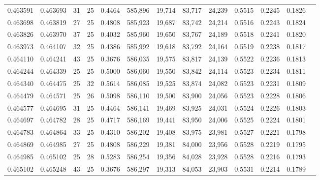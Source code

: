 \begin{tabular}{rrrrrrrrrrrrr}
0.463591 & 0.463693 &    31 &  25 &                                     0.4464 & 585,896 &  19,714 &  83,717 &  24,239 & 0.5515 & 0.2245 & 0.1826 \\
0.463698 & 0.463819 &    27 &  25 &                                     0.4808 & 585,923 &  19,687 &  83,742 &  24,214 & 0.5516 & 0.2243 & 0.1824 \\
0.463826 & 0.463970 &    37 &  25 &                                     0.4032 & 585,960 &  19,650 &  83,767 &  24,189 & 0.5518 & 0.2241 & 0.1820 \\
0.463973 & 0.464107 &    32 &  25 &                                     0.4386 & 585,992 &  19,618 &  83,792 &  24,164 & 0.5519 & 0.2238 & 0.1817 \\
0.464110 & 0.464241 &    43 &  25 &                                     0.3676 & 586,035 &  19,575 &  83,817 &  24,139 & 0.5522 & 0.2236 & 0.1813 \\
0.464244 & 0.464339 &    25 &  25 &                                     0.5000 & 586,060 &  19,550 &  83,842 &  24,114 & 0.5523 & 0.2234 & 0.1811 \\
0.464340 & 0.464475 &    25 &  32 &                                     0.5614 & 586,085 &  19,525 &  83,874 &  24,082 & 0.5523 & 0.2231 & 0.1809 \\
0.464479 & 0.464571 &    25 &  26 &                                     0.5098 & 586,110 &  19,500 &  83,900 &  24,056 & 0.5523 & 0.2228 & 0.1806 \\
0.464577 & 0.464695 &    31 &  25 &                                     0.4464 & 586,141 &  19,469 &  83,925 &  24,031 & 0.5524 & 0.2226 & 0.1803 \\
0.464697 & 0.464782 &    28 &  25 &                                     0.4717 & 586,169 &  19,441 &  83,950 &  24,006 & 0.5525 & 0.2224 & 0.1801 \\
0.464783 & 0.464864 &    33 &  25 &                                     0.4310 & 586,202 &  19,408 &  83,975 &  23,981 & 0.5527 & 0.2221 & 0.1798 \\
0.464869 & 0.464985 &    27 &  25 &                                     0.4808 & 586,229 &  19,381 &  84,000 &  23,956 & 0.5528 & 0.2219 & 0.1795 \\
0.464985 & 0.465102 &    25 &  28 &                                     0.5283 & 586,254 &  19,356 &  84,028 &  23,928 & 0.5528 & 0.2216 & 0.1793 \\
0.465102 & 0.465248 &    43 &  25 &                                     0.3676 & 586,297 &  19,313 &  84,053 &  23,903 & 0.5531 & 0.2214 & 0.1789 \\

\end{tabular}
